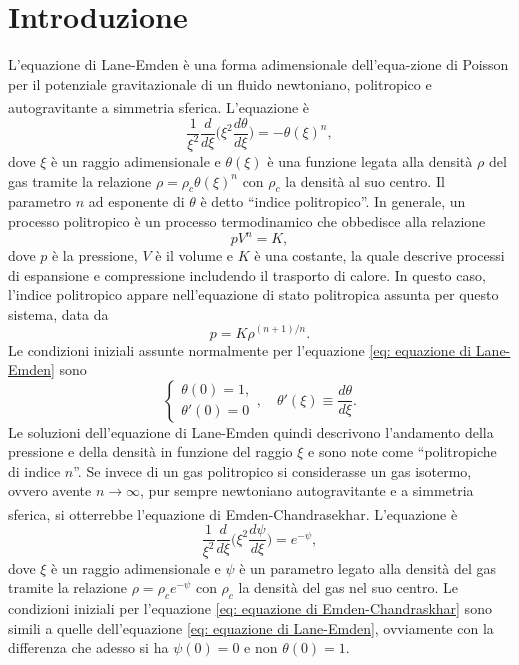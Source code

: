 \documentclass{article}
\newcommand{\supcite}[2][]{\textsuperscript{\cite[#1]{#2}}}
\numberwithin{equation}{section}
\begin{document}
\section{Introduzione}
L'equazione di Lane-Emden è una forma adimensionale dell'equa-zione di Poisson per il potenziale gravitazionale di un fluido newtoniano, politropico e autogravitante a simmetria sferica. L'equazione\supcite[pagg.~86--88]{chandrasekhar1957} è 
\begin{equation}
\label{eq: equazione di Lane-Emden}
    \frac{1}{\xi^2}\frac{d}{d\xi}\bigg(\xi^2\frac{d\theta}{d\xi}\bigg) = -\theta(\xi)^n,
\end{equation}
dove $\xi$ è un raggio adimensionale e $\theta(\xi)$ è una funzione legata alla densità $\rho$ del gas tramite la relazione $\rho = \rho_c\theta(\xi)^n$ con $\rho_c$ la densità al suo centro. Il parametro $n$ ad esponente di $\theta$ è detto ``indice politropico''. In generale, un processo politropico è un processo termodinamico che obbedisce alla relazione
\begin{equation}
    pV^n = K,
\end{equation}
dove $p$ è la pressione, $V$ è il volume e $K$ è una costante, la quale descrive processi di espansione e compressione includendo il trasporto di calore. In questo caso, l'indice politropico appare nell'equazione di stato politropica assunta per questo sistema, data da
\begin{equation}
\label{eq: equazione di stato politropica}
    p = K\rho^{(n+1)/n}.
\end{equation}
Le condizioni iniziali assunte normalmente per l'equazione \eqref{eq: equazione di Lane-Emden} sono 
\begin{equation}
\label{eq: condizioni iniziali dell'equazione di Lane-Emden}
    \begin{cases}
        \theta(0) = 1, \\
        \theta'(0) = 0
    \end{cases},\quad \theta'(\xi) \equiv \frac{d\theta}{d\xi}.
\end{equation}
Le soluzioni dell'equazione di Lane-Emden quindi descrivono l'andamento della pressione e della densità in funzione del raggio $\xi$ e sono note come ``politropiche di indice $n$''. Se invece di un gas politropico si considerasse un gas isotermo, ovvero avente $n \to \infty$, pur sempre newtoniano autogravitante e a simmetria sferica, si otterrebbe l'equazione di Emden-Chandrasekhar. L'equazione\supcite[pagg.~155--157]{chandrasekhar1957} è
\begin{equation}
\label{eq: equazione di Emden-Chandraskhar}
    \frac{1}{\xi^2}\frac{d}{d\xi}\bigg(\xi^2\frac{d\psi}{d\xi}\bigg) = e^{-\psi},
\end{equation}
dove $\xi$ è un raggio adimensionale e $\psi$ è un parametro legato alla densità del gas tramite la relazione $\rho = \rho_ce^{-\psi}$ con $\rho_c$ la densità del gas nel suo centro. Le condizioni iniziali per l'equazione \eqref{eq: equazione di Emden-Chandraskhar} sono simili a quelle dell'equazione \eqref{eq: equazione di Lane-Emden}, ovviamente con la differenza che adesso si ha $\psi(0) = 0$ e non $\theta(0) = 1$.
\end{document}
